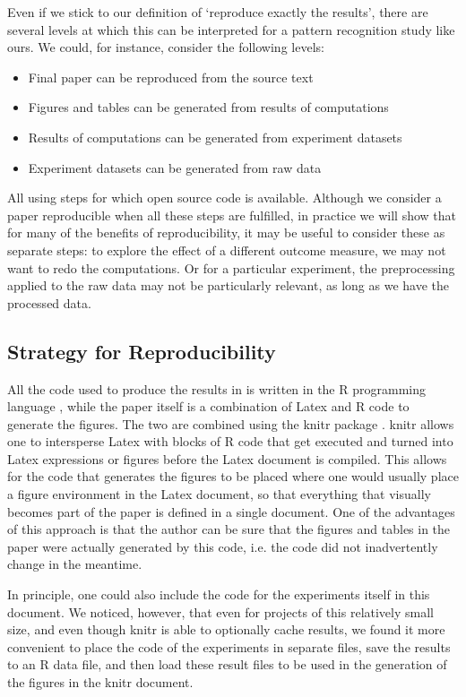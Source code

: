 \documentclass[runningheads,a4paper]{llncs}\usepackage[]{graphicx}\usepackage[]{color}
\begin{document}
Even if we stick to our definition of `reproduce exactly the results', there are several levels at which this can be interpreted for a pattern recognition study like ours. We could, for instance, consider the following levels:
\begin{itemize}
\item Final paper can be reproduced from the source text
\item Figures and tables can be generated from results of computations
\item Results of computations can be generated from experiment datasets
\item Experiment datasets can be generated from raw data 
\end{itemize}
All using steps for which open source code is available. Although we consider a paper reproducible when all these steps are fulfilled, in practice we will show that for many of the benefits of reproducibility, it may be useful to consider these as separate steps: to explore the effect of a different outcome measure, we may not want to redo the computations. Or for a particular experiment, the preprocessing applied to the raw data may not be particularly relevant, as long as we have the processed data.

\subsection{Strategy for Reproducibility}
All the code used to produce the results in \cite{Krijthe2016a} is written in the R programming language \cite{RCoreTeam2016}, while the paper itself is a combination of Latex and R code to generate the figures. The two are combined using the knitr package \cite{Xie2014}. knitr allows one to intersperse Latex with blocks of R code that get executed and turned into Latex expressions or figures before the Latex document is compiled. This allows for the code that generates the figures to be placed where one would usually place a figure environment in the Latex document, so that everything that visually becomes part of the paper is defined in a single document. One of the advantages of this approach is that the author can be sure that the figures and tables in the paper were actually generated by this code, i.e. the code did not inadvertently change in the meantime.

In principle, one could also include the code for the experiments itself in this document. We noticed, however, that even for projects of this relatively small size, and even though knitr is able to optionally cache results, we found it more convenient to place the code of the experiments in separate files, save the results to an R data file, and then load these result files to be used in the generation of the figures in the knitr document.
\end{document}

